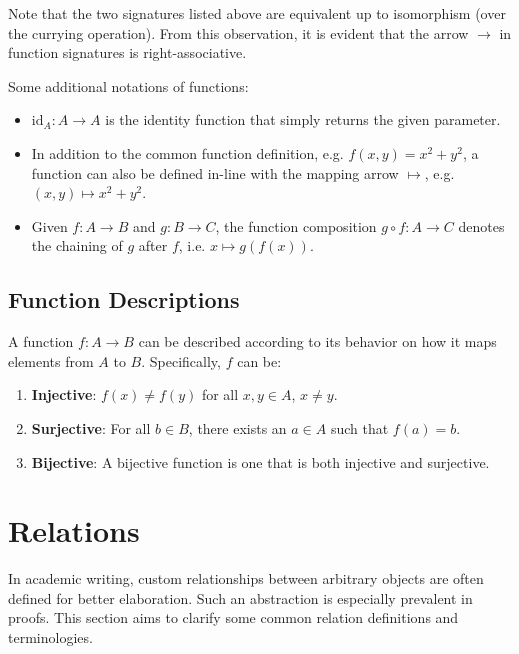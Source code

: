 \documentclass[12pt]{article}
\theoremstyle{definition}
\newcommand{\id}[1]{\text{id}_{#1}}
\begin{document}
 	Note that the two signatures listed above are equivalent up to isomorphism (over the currying operation). From this observation, it is evident that the arrow $\to$ in function signatures is right-associative.
 	
 	Some additional notations of functions:
 	\begin{itemize}
 		\item $\id{A}: A \to A$ is the identity function that simply returns the given parameter.
 		\item In addition to the common function definition, e.g. $f(x, y) = x^2 + y^2$, a function can also be defined in-line with the mapping arrow $\mapsto$, e.g. $(x, y) \mapsto x^2 + y^2$.
 		\item Given $f : A \to B$ and $g : B \to C$, the function composition $g \circ f : A \to C$ denotes the chaining of $g$ after $f$, i.e. $x \mapsto g(f(x))$.
 	\end{itemize}
 	
 	\subsection{Function Descriptions}
 	
 	A function $f : A \to B$ can be described according to its behavior on how it maps elements from $A$ to $B$. Specifically, $f$ can be:
 	\begin{enumerate}
 		\item \textbf{Injective}: $f(x) \neq f(y)$ for all $x, y \in A$, $x \neq y$.
 		\item \textbf{Surjective}: For all $b \in B$, there exists an $a \in A$ such that $f(a) = b$.
 		\item \textbf{Bijective}: A bijective function is one that is both injective and surjective.
 	\end{enumerate}
	
	\section{Relations}
	
	In academic writing, custom relationships between arbitrary objects are often defined for better elaboration. Such an abstraction is especially prevalent in proofs. This section aims to clarify some common relation definitions and terminologies.
	
\end{document}
